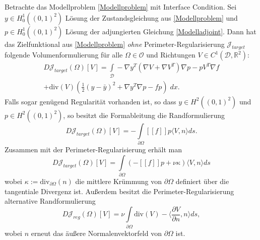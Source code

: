 \begin{theorem}
	Betrachte das Modellproblem \ref{Modellproblem} mit Interface Condition. Sei $y\in H^1_0((0,1)^2)$ Lösung der Zustandsgleichung aus \ref{Modellproblem} und $p\in H^1_0((0,1)^2)$ Lösung der adjungierten Gleichung \ref{Modelladjoint}. Dann hat das Zielfunktional aus \ref{Modellproblem} \textit{ohne} Perimeter-Regularisierung $\mathcal{J}_{target}$ folgende Volumenformulierung für alle $\Omega \in \mathcal{O}$ und Richtungen $V \in C^1(\mathcal{D}, \mathbb{R}^2)$:
	\begin{equation}\label{shapederivvolume}
	\begin{aligned}
		D\mathcal{J}_{target}(\Omega)[V] = \underset{\mathcal{D}}{\int} -\nabla y^T (\nabla V + \nabla V^T) \nabla p - p V^T \nabla f \\ + \text{div} (V) \left(\frac{1}{2}(y-\bar{y})^2 + \nabla y^T \nabla p - fp\right)\; dx.
	\end{aligned}
	\end{equation}
	Falls sogar genügend Regularität vorhanden ist, so dass $y \in H^2((0,1)^2)$ und $p \in H^2((0,1)^2)$, so besitzt die Formableitung die Randformulierung
	\begin{equation}\label{shapederivsurfacetarget}
	D\mathcal{J}_{target}(\Omega)[V] = -\underset{\partial\Omega}{\int} [[f]]p \langle V,n \rangle ds.
	\end{equation}
	Zusammen mit der Perimeter-Regularisierung erhält man
	\begin{equation}
	D\mathcal{J}_{target}(\Omega)[V] = \underset{\partial\Omega}{\int} (-[[f]]p  + \nu\kappa )\langle V,n \rangle ds 
	\end{equation}
	wobei $\kappa := \text{div}_{\partial\Omega}(n)$ die mittlere Krümmung von $\partial\Omega$ definiert über die tangentiale Divergenz ist. Außerdem besitzt die Perimeter-Regularisierung alternative  Randformulierung
	\begin{equation}\label{shapederivsurfaceperimeter}
	D\mathcal{J}_{reg}(\Omega)[V] = \nu\underset{\partial\Omega}{\int} \text{div}(V) - \langle\frac{\partial V}{\partial n}, n\rangle ds,
	\end{equation}
	wobei $n$ erneut das äußere Normalenvektorfeld von $\partial\Omega$ ist.
\end{theorem}

